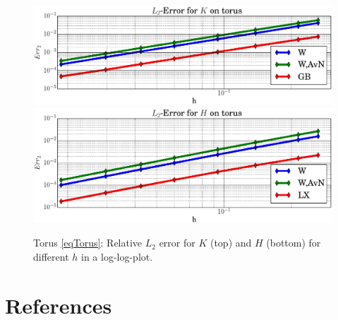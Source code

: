   \begin{figure}
    \centering\includegraphics[width=.49\textwidth]{bilder/torus/L2K.eps}
    \centering\includegraphics[width=.49\textwidth]{bilder/torus/L2H.eps}
    \caption{Torus \eqref{eqTorus}: Relative \( L_{2} \) error for \( K \) (top) and
                                                     \( H \) (bottom) for different \( h \) in a log-log-plot.}
    \label{figTorusL2Err}
  \end{figure}



\section*{References}




